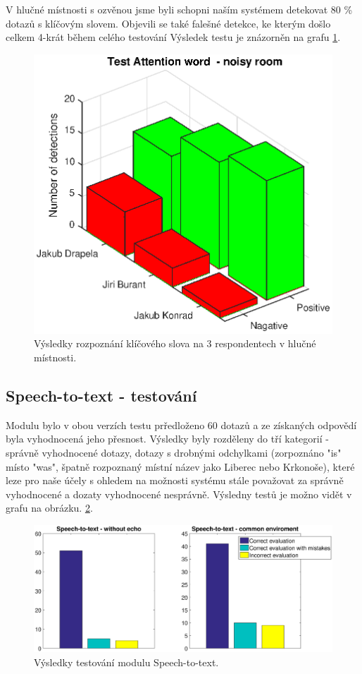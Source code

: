 \documentclass[12pt,a4paper]{article}
\begin{document}
V hlučné místnosti s ozvěnou jsme byli schopni naším systémem detekovat 80 \% dotazů s klíčovým slovem. Objevili se také falešné detekce, ke kterým došlo celkem 4-krát během celého testování Výsledek testu je znázorněn na grafu \ref{fig:AttentionWord2}. 

	\begin{figure}[ht]
		
		\centering
		\includegraphics[width = 12cm]{AtWr_test2.eps}
		\caption{Výsledky rozpoznání klíčového slova na 3 respondentech v hlučné místnosti.}
		\label{fig:AttentionWord2}
	\end{figure}

\subsection{Speech-to-text - testování}
Modulu bylo v obou verzích testu prředloženo 60 dotazů a ze získaných odpovědí byla vyhodnocená jeho přesnost. Výsledky byly rozděleny do tří kategorií - správně vyhodnocené dotazy, dotazy s drobnými odchylkami (zorpoznáno "is" místo "was", špatně rozpoznaný místní název jako Liberec nebo Krkonoše), které leze pro naše účely s ohledem na možnosti systému stále považovat za správně vyhodnocené a dozaty vyhodnocené nesprávně.
Výsledny testů je možno vidět v grafu na obrázku.
 \ref{fig:speech}.
\begin{figure}[ht]
	\begin{center}
		\includegraphics[width = 1\textwidth ]{stt.eps}
		\caption{Výsledky testování modulu Speech-to-text.}
		\label{fig:speech}
	\end{center}
\end{figure}
\end{document}
